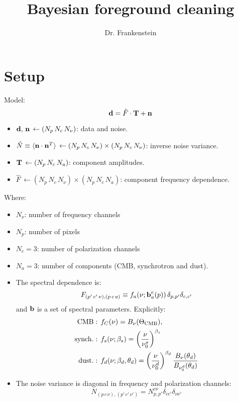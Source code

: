 \documentclass[a4paper,10pt]{article}
\title{Bayesian foreground cleaning}
\author{Dr. Frankenstein}
\begin{document}
\maketitle

\section{Setup}
Model:
\begin{equation}
  {\bf d}=\hat{F}\cdot{\bf T}+{\bf n}
\end{equation}

\begin{itemize}
 \item ${\bf d},\,{\bf n}\,\leftarrow (N_p\,N_c\,N_\nu)$: data and noise.
 \item $\hat{N}\equiv\langle{\bf n}\cdot{\bf n}^T\rangle\,\leftarrow (N_p\,N_c\,N_\nu)\times(N_p\,N_c\,N_\nu)$: inverse noise variance.
 \item ${\bf T}\,\leftarrow (N_p\,N_c\,N_a)$: component amplitudes.
 \item $\hat{F}\,\leftarrow (N_p\,N_c\,N_\nu)\times(N_p\,N_c\,N_a)$: component frequency dependence.
\end{itemize}
Where:
\begin{itemize}
 \item $N_\nu$: number of frequency channels
 \item $N_p$: number of pixels
 \item $N_c=3$: number of polarization channels
 \item $N_a=3$: number of components (CMB, synchrotron and dust).
 \item The spectral dependence is:
 \begin{equation}
  F_{(p'\,c'\,\nu),(p\,c\,a)}\equiv f_a(\nu;{\bf b}_a^c(p))\,\delta_{p,p'}\delta_{c,c'}
 \end{equation}
 and ${\bf b}$ is a set of spectral parameters. Explicitly:
 \begin{align}
   {\rm CMB}&:\,f_C(\nu)=B_\nu(\Theta_{\rm CMB}),\\
   {\rm synch.}&:\,f_s(\nu;\beta_s)=\left(\frac{\nu}{\nu_0^s}\right)^{\beta_s}\\
   {\rm dust.}&:\,f_d(\nu;\beta_d,\theta_d)=\left(\frac{\nu}{\nu_0^d}\right)^{\beta_d}\frac{B_\nu(\theta_d)}{B_{\nu_0^d}(\theta_d)}
 \end{align}
 \item The noise variance is diagonal in frequency and polarization channels:
 \begin{equation}
   N_{(p\,c\,\nu),(p'\,c'\,\nu')}=N_{p,p'}^{c\nu}\delta_{cc'}\delta_{\nu\nu'}
 \end{equation}
\end{itemize}
\end{document}
